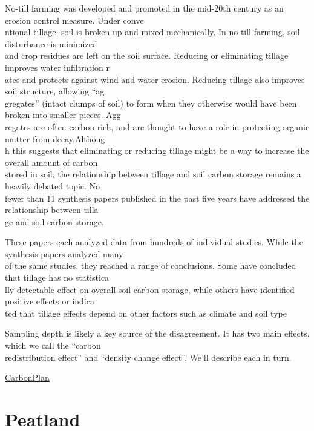 \documentclass[
]{book}
\begin{document}
No-till farming was developed and promoted in the mid-20th century as an erosion control measure. Under conve\\
ntional tillage, soil is broken up and mixed mechanically. In no-till farming, soil disturbance is minimized\\
and crop residues are left on the soil surface. Reducing or eliminating tillage improves water infiltration r\\
ates and protects against wind and water erosion. Reducing tillage also improves soil structure, allowing ``ag\\
gregates'' (intact clumps of soil) to form when they otherwise would have been broken into smaller pieces. Agg\\
regates are often carbon rich, and are thought to have a role in protecting organic matter from decay.Althoug\\
h this suggests that eliminating or reducing tillage might be a way to increase the overall amount of carbon\\
stored in soil, the relationship between tillage and soil carbon storage remains a heavily debated topic. No\\
fewer than 11 synthesis papers published in the past five years have addressed the relationship between tilla\\
ge and soil carbon storage.

These papers each analyzed data from hundreds of individual studies. While the synthesis papers analyzed many\\
of the same studies, they reached a range of conclusions. Some have concluded that tillage has no statistica\\
lly detectable effect on overall soil carbon storage, while others have identified positive effects or indica\\
ted that tillage effects depend on other factors such as climate and soil type

Sampling depth is likely a key source of the disagreement. It has two main effects, which we call the ``carbon\\
redistribution effect'' and ``density change effect''. We'll describe each in turn.

\href{https://carbonplan.org/research/soil-depth-sampling}{CarbonPlan}

\hypertarget{peatland}{%
\section{Peatland}\label{peatland}}
\end{document}
